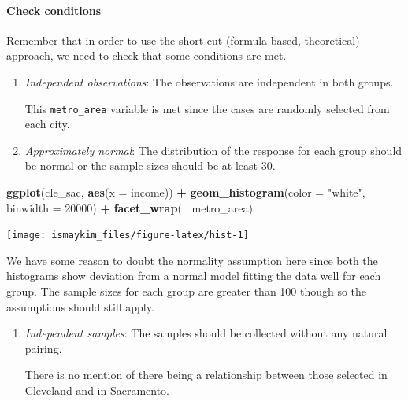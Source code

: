 \documentclass[12pt,]{krantz}
\makeatletter
\newenvironment{Shaded}{\begin{snugshade}}{\end{snugshade}}
\newcommand{\KeywordTok}[1]{\textcolor[rgb]{0.27,0.27,0.27}{\textbf{#1}}}
\newcommand{\DataTypeTok}[1]{\textcolor[rgb]{0.27,0.27,0.27}{#1}}
\newcommand{\DecValTok}[1]{\textcolor[rgb]{0.06,0.06,0.06}{#1}}
\newcommand{\StringTok}[1]{\textcolor[rgb]{0.5,0.5,0.5}{#1}}
\newcommand{\OperatorTok}[1]{\textcolor[rgb]{0.43,0.43,0.43}{\textbf{#1}}}
\newcommand{\NormalTok}[1]{#1}
\let\oldparagraph\paragraph
\renewcommand{\paragraph}[1]{\oldparagraph{#1}\mbox{}}
\newenvironment{kframe}{%
\medskip{}
\setlength{\fboxsep}{.8em}
 \def\at@end@of@kframe{}%
 \ifinner\ifhmode%
  \def\at@end@of@kframe{\end{minipage}}%
  \begin{minipage}{\columnwidth}%
 \fi\fi%
 \def\FrameCommand##1{\hskip\@totalleftmargin \hskip-\fboxsep
 \colorbox{shadecolor}{##1}\hskip-\fboxsep
     \hskip-\linewidth \hskip-\@totalleftmargin \hskip\columnwidth}%
 \MakeFramed {\advance\hsize-\width
   \@totalleftmargin\z@ \linewidth\hsize
   \@setminipage}}%
 {\par\unskip\endMakeFramed%
 \at@end@of@kframe}
\renewenvironment{Shaded}{\begin{kframe}}{\end{kframe}}
\theoremstyle{definition}
\theoremstyle{definition}
\theoremstyle{definition}
\theoremstyle{remark}
\makeatother
\begin{document}
\paragraph{Check conditions}\label{check-conditions-3}

Remember that in order to use the short-cut (formula-based, theoretical)
approach, we need to check that some conditions are met.

\begin{enumerate}
\def\labelenumi{\arabic{enumi}.}
\item
  \emph{Independent observations}: The observations are independent in
  both groups.

  This \texttt{metro\_area} variable is met since the cases are randomly
  selected from each city.
\item
  \emph{Approximately normal}: The distribution of the response for each
  group should be normal or the sample sizes should be at least 30.
\end{enumerate}

\begin{Shaded}
\begin{Highlighting}[]
\KeywordTok{ggplot}\NormalTok{(cle_sac, }\KeywordTok{aes}\NormalTok{(}\DataTypeTok{x =}\NormalTok{ income)) }\OperatorTok{+}
\StringTok{  }\KeywordTok{geom_histogram}\NormalTok{(}\DataTypeTok{color =} \StringTok{"white"}\NormalTok{, }\DataTypeTok{binwidth =} \DecValTok{20000}\NormalTok{) }\OperatorTok{+}
\StringTok{  }\KeywordTok{facet_wrap}\NormalTok{(}\OperatorTok{~}\StringTok{ }\NormalTok{metro_area)}
\end{Highlighting}
\end{Shaded}

\begin{center}\texttt{[image: ismaykim\_files/figure-latex/hist-1]} \end{center}

We have some reason to doubt the normality assumption here since both
the histograms show deviation from a normal model fitting the data well
for each group. The sample sizes for each group are greater than 100
though so the assumptions should still apply.

\begin{enumerate}
\def\labelenumi{\arabic{enumi}.}
\setcounter{enumi}{2}
\item
  \emph{Independent samples}: The samples should be collected without
  any natural pairing.

  There is no mention of there being a relationship between those
  selected in Cleveland and in Sacramento.
\end{enumerate}
\end{document}
